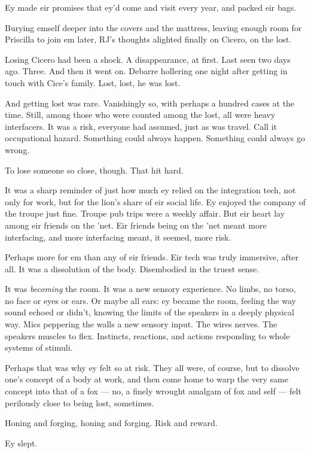 Ey made eir promises that ey'd come and visit every year, and packed eir bags.

Burying emself deeper into the covers and the mattress, leaving enough room for Priscilla to join em later, RJ's thoughts alighted finally on Cicero, on the lost.

Losing Cicero had been a shock. A disappearance, at first. Last seen two days ago. Three. And then it went on. Debarre hollering one night after getting in touch with Cice's family. Lost, lost, he was lost.

And getting lost was rare. Vanishingly so, with perhaps a hundred cases at the time. Still, among those who were counted among the lost, all were heavy interfacers. It was a risk, everyone had assumed, just as was travel. Call it occupational hazard. Something could always happen. Something could always go wrong.

To lose someone so close, though. That hit hard.

It was a sharp reminder of just how much ey relied on the integration tech, not only for work, but for the lion's share of eir social life. Ey enjoyed the company of the troupe just fine. Troupe pub trips were a weekly affair. But eir heart lay among eir friends on the 'net. Eir friends being on the 'net meant more interfacing, and more interfacing meant, it seemed, more risk.

Perhaps more for em than any of eir friends. Eir tech was truly immersive, after all. It was a dissolution of the body. Disembodied in the truest sense.

It was \emph{becoming} the room. It was a new sensory experience. No limbs, no torso, no face or eyes or ears. Or maybe all ears: ey became the room, feeling the way sound echoed or didn't, knowing the limits of the speakers in a deeply physical way. Mics peppering the walls a new sensory input. The wires nerves. The speakers muscles to flex. Instincts, reactions, and actions responding to whole systems of stimuli.

Perhaps that was why ey felt so at risk. They all were, of course, but to dissolve one's concept of a body at work, and then come home to warp the very same concept into that of a fox — no, a finely wrought amalgam of fox and self — felt perilously close to being lost, sometimes.

Honing and forging, honing and forging. Risk and reward.

Ey slept.
